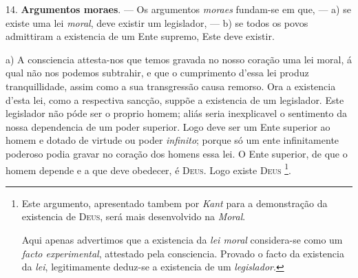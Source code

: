 14. \textbf{Argumentos moraes}. --- Os argumentos \emph{moraes} fundam-se em que, --- a) se existe uma lei \emph{moral}, deve existir um legislador, --- b) se todos os povos admittiram a existencia de um Ente supremo, Este deve existir.

a) A consciencia attesta-nos que temos gravada no nosso coração uma lei moral, á qual não nos podemos subtrahir, e que o cumprimento d'essa lei produz tranquillidade, assim como a sua transgressão causa remorso. Ora a existencia d'esta lei, como a respectiva sancção, suppõe a existencia de um legislador. Este legislador não póde ser o proprio homem; aliás seria inexplicavel o sentimento da nossa dependencia de um poder superior. Logo deve ser um Ente superior ao homem e dotado de virtude ou poder \emph{infinito}; porque só um ente infinitamente poderoso podia gravar no coração dos homens essa lei. O Ente superior, de que o homem depende e a que deve obedecer, é \textsc{Deus}. Logo existe \textsc{Deus} \footnote{Este argumento, apresentado tambem por \emph{Kant} para a demonstração da existencia de \textsc{Deus}, será mais desenvolvido na \emph{Moral}.\par Aqui apenas advertimos que a existencia da \emph{lei moral} considera-se como um \emph{facto experimental}, attestado pela consciencia. Provado o facto da existencia da \emph{lei}, legitimamente deduz-se a existencia de um \emph{legislador}.}.
